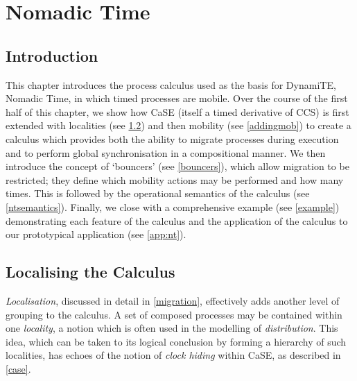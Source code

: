 
\chapter{Nomadic Time}
\label{nt}

\section{Introduction}

This chapter introduces the process calculus used as the basis for
DynamiTE, Nomadic Time, in which timed processes are mobile.  Over the
course of the first half of this chapter, we show how CaSE (itself a
timed derivative of CCS) is first extended with localities (see
\ref{localising}) and then mobility (see \ref{addingmob}) to create a
calculus which provides both the ability to migrate processes during
execution and to perform global synchronisation in a compositional
manner.  We then introduce the concept of `bouncers' (see
\ref{bouncers}), which allow migration to be restricted; they define
which mobility actions may be performed and how many times.  This is
followed by the operational semantics of the calculus (see
\ref{ntsemantics}).  Finally, we close with a comprehensive example
(see \ref{example}) demonstrating each feature of the calculus and the
application of the calculus to our prototypical application (see
\ref{app:nt}).

\section{Localising the Calculus}
\label{localising}

\emph{Localisation}, discussed in detail in \ref{migration}, effectively
adds another level of grouping to the calculus.  A set of composed
processes may be contained within one \emph{locality}, a notion which is
often used in the modelling of \emph{distribution}.  This idea, which
can be taken to its logical conclusion by forming a hierarchy of such
localities, has echoes of the notion of \emph{clock hiding} within CaSE,
as described in \ref{case}.

